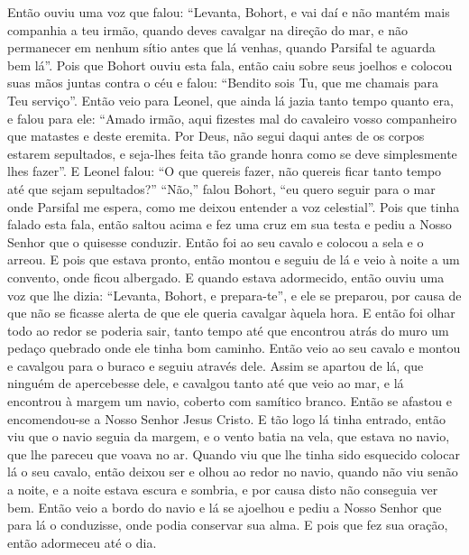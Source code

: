 Então ouviu uma voz que falou: “Levanta, Bohort, e vai daí e não mantém mais
companhia a teu irmão, quando deves cavalgar na direção do mar, e não
permanecer em nenhum sítio antes que lá venhas, quando Parsifal te aguarda bem
lá”. Pois que Bohort ouviu esta fala, então caiu sobre seus joelhos e
colocou suas mãos juntas contra o céu e falou: “Bendito sois Tu, que me chamais
para Teu serviço”. Então veio para Leonel, que ainda lá jazia tanto tempo
quanto era, e falou para ele: “Amado irmão, aqui fizestes mal do cavaleiro
vosso companheiro que matastes e deste eremita. Por Deus, não segui daqui antes
de os corpos estarem sepultados, e seja-lhes feita tão grande honra como se deve
simplesmente lhes fazer”. E Leonel falou: “O que quereis fazer, não quereis
ficar tanto tempo até que sejam sepultados?” “Não,” falou Bohort, “eu quero
seguir para o mar onde Parsifal me espera, como me deixou entender a voz
celestial”. Pois que tinha falado esta fala, então saltou acima e fez uma cruz
em sua testa e pediu a Nosso Senhor que o quisesse conduzir. Então foi ao seu
cavalo e colocou a sela e o arreou. E pois que estava pronto, então montou e
seguiu de lá e veio à noite a um convento, onde ficou albergado. E quando
estava adormecido, então ouviu uma voz que lhe dizia: “Levanta, Bohort, e
prepara-te”,  e ele se preparou, por causa de que não se ficasse alerta
de que ele queria cavalgar àquela hora. E então foi olhar todo ao redor se
poderia sair, tanto tempo até que encontrou atrás do muro um pedaço quebrado
onde ele tinha bom caminho. Então veio ao seu cavalo e montou e cavalgou para o
buraco e seguiu através dele. Assim se apartou de lá, que ninguém de
apercebesse dele, e cavalgou tanto até que veio ao mar, e lá encontrou à margem
um navio, coberto com samítico branco. Então se afastou e encomendou-se a Nosso
Senhor Jesus Cristo. E tão logo lá tinha entrado, então viu que o navio seguia
da margem, e o vento batia na vela, que estava no navio, que lhe pareceu que
voava no ar. Quando viu que lhe tinha sido esquecido colocar lá o seu cavalo,
então deixou ser e olhou ao redor no navio, quando não viu senão a noite, e a
noite estava escura e sombria, e por causa disto não conseguia ver bem. Então
veio a bordo do navio e lá se ajoelhou e pediu a Nosso Senhor que para lá o
conduzisse, onde podia conservar sua alma. E pois que fez sua oração, então
adormeceu até o dia.

